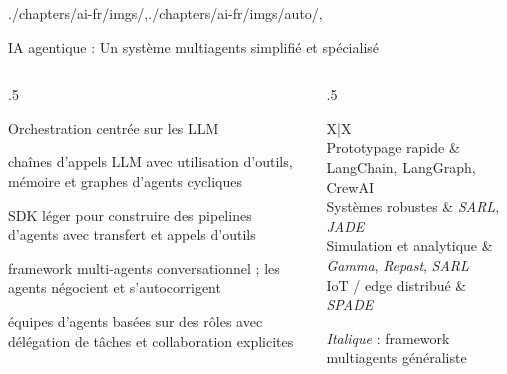 \begin{graphicspathcontext}{{./chapters/ai-fr/imgs/},{./chapters/ai-fr/imgs/auto/},\old}
\begin{frame}[t]{{IA agentique :} Un système multiagents simplifié et spécialisé}
	\small
	\begin{columns}
		\begin{column}{.5\linewidth}
			\begin{block}{Orchestration centrée sur les LLM}
				\begin{compactdescription}
				\item[LangChain / LangGraph] chaînes d'appels LLM avec
				utilisation d'outils, mémoire et graphes d'agents cycliques
				\item[OpenAI Agents SDK] SDK léger pour construire des
				pipelines d'agents avec transfert et appels d'outils
				\item[AutoGen (Microsoft)] framework multi-agents conversationnel ;
				les agents négocient et s'autocorrigent
				\item[CrewAI] équipes d'agents basées sur des rôles avec
				délégation de tâches et collaboration explicites
				\end{compactdescription}
			\end{block}
    		\end{column}
		\begin{column}{.5\linewidth}
			\begin{stabularx}[title={Choisir le bon outil}]{X|X}
			 \\
			Prototypage rapide & LangChain, LangGraph, CrewAI \\
			\hline
			Systèmes robustes & \textit{SARL}, \textit{JADE} \\
			\hline
			Simulation et analytique & \textit{Gamma}, \textit{Repast}, \textit{SARL} \\
			\hline
			IoT / edge distribué & \textit{SPADE}  \\
			\end{stabularx}
			{\smaller\smaller \textit{Italique} : framework multiagents généraliste}
    		\end{column}
	\end{columns}
	\normalsize
\end{frame}

\end{graphicspathcontext}

\endinput

